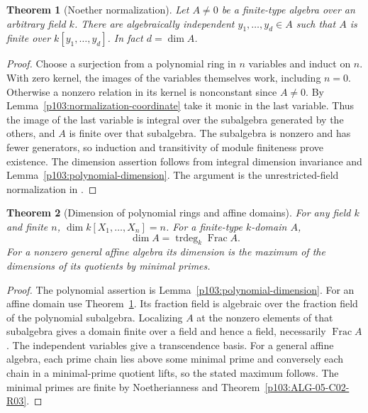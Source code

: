 \documentclass[11pt,oneside,openany]{book}
\newtheorem{theorem}{Theorem}[chapter]
\theoremstyle{definition}
\theoremstyle{remark}
\begin{document}
\begin{theorem}[Noether normalization]\label{p103:ALG-05-C03-R02}
Let \(A\ne0\) be a finite-type algebra over an arbitrary field \(k\). There are algebraically independent \(y_1,\ldots,y_d\in A\) such that \(A\) is finite over \(k[y_1,\ldots,y_d]\). In fact \(d=\dim A\).
\end{theorem}
\begin{proof}
Choose a surjection from a polynomial ring in \(n\) variables and induct on \(n\). With zero kernel, the images of the variables themselves work, including \(n=0\). Otherwise a nonzero relation in its kernel is nonconstant since \(A\ne0\). By Lemma~\ref{p103:normalization-coordinate} take it monic in the last variable. Thus the image of the last variable is integral over the subalgebra generated by the others, and \(A\) is finite over that subalgebra. The subalgebra is nonzero and has fewer generators, so induction and transitivity of module finiteness prove existence. The dimension assertion follows from integral dimension invariance and Lemma~\ref{p103:polynomial-dimension}. The argument is the unrestricted-field normalization in \cite[Lemma 13.2 and Theorem 13.3]{eisenbud}.
\end{proof}

\begin{theorem}[Dimension of polynomial rings and affine domains]\label{p103:ALG-05-C03-R03}
For any field \(k\) and finite \(n\), \(\dim k[X_1,\ldots,X_n]=n\). For a finite-type \(k\)-domain \(A\),
\[
 \dim A=\operatorname{trdeg}_k\operatorname{Frac}A .
\]
For a nonzero general affine algebra its dimension is the maximum of the dimensions of its quotients by minimal primes.
\end{theorem}
\begin{proof}
The polynomial assertion is Lemma~\ref{p103:polynomial-dimension}. For an affine domain use Theorem~\ref{p103:ALG-05-C03-R02}. Its fraction field is algebraic over the fraction field of the polynomial subalgebra. Localizing \(A\) at the nonzero elements of that subalgebra gives a domain finite over a field and hence a field, necessarily \(\operatorname{Frac}A\). The independent variables give a transcendence basis. For a general affine algebra, each prime chain lies above some minimal prime and conversely each chain in a minimal-prime quotient lifts, so the stated maximum follows. The minimal primes are finite by Noetherianness and Theorem~\ref{p103:ALG-05-C02-R03}.
\end{proof}
\end{document}
